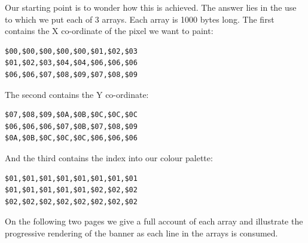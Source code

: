 Our starting point is to wonder how this is achieved. The answer lies in the use to which we put each of 3 arrays.
Each array is 1000 bytes long.
The first contains the X co-ordinate of the pixel we want to paint:
\begin{lstlisting}
$00,$00,$00,$00,$00,$01,$02,$03
$01,$02,$03,$04,$04,$06,$06,$06
$06,$06,$07,$08,$09,$07,$08,$09
\end{lstlisting}
The second contains the Y co-ordinate:
\begin{lstlisting}
$07,$08,$09,$0A,$0B,$0C,$0C,$0C
$06,$06,$06,$07,$0B,$07,$08,$09
$0A,$0B,$0C,$0C,$0C,$06,$06,$06
\end{lstlisting}
And the third contains the index into our colour palette:
\begin{lstlisting}
$01,$01,$01,$01,$01,$01,$01,$01
$01,$01,$01,$01,$01,$02,$02,$02
$02,$02,$02,$02,$02,$02,$02,$02
\end{lstlisting}
On the following two pages we give a full account of each array and illustrate the progressive rendering of the banner
as each line in the arrays is consumed.
\clearpage
